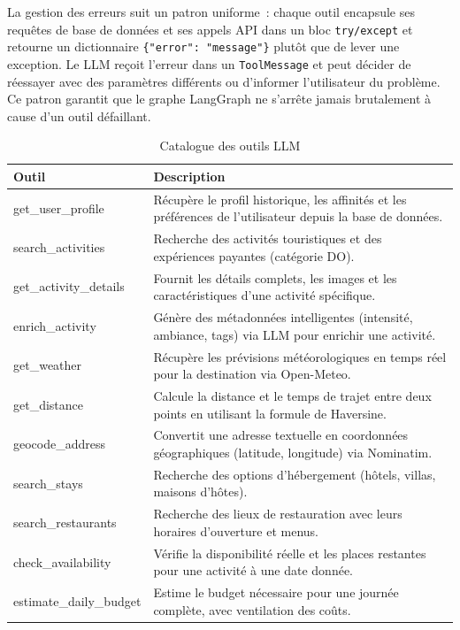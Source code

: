 La gestion des erreurs suit un patron uniforme~: chaque outil encapsule ses requêtes de base
de données et ses appels API dans un bloc \texttt{try/except} et retourne un dictionnaire
\texttt{\{"error": "message"\}} plutôt que de lever une exception. Le LLM reçoit l'erreur
dans un \texttt{ToolMessage} et peut décider de réessayer avec des paramètres différents ou
d'informer l'utilisateur du problème. Ce patron garantit que le graphe LangGraph ne s'arrête
jamais brutalement à cause d'un outil défaillant.

\begin{table}[H]
    \centering
    \caption{Catalogue des outils LLM}
    \label{tab:tools_catalog}
    \footnotesize
    \begin{tabular}{p{4.5cm} p{10.5cm}}
        \toprule
        \textbf{Outil} & \textbf{Description} \\
        \midrule
        get\_user\_profile & Récupère le profil historique, les affinités et les préférences de l'utilisateur depuis la base de données. \\[2pt]
        search\_activities & Recherche des activités touristiques et des expériences payantes (catégorie DO). \\[2pt]
        get\_activity\_details & Fournit les détails complets, les images et les caractéristiques d'une activité spécifique. \\[2pt]
        enrich\_activity & Génère des métadonnées intelligentes (intensité, ambiance, tags) via LLM pour enrichir une activité. \\[2pt]
        get\_weather & Récupère les prévisions météorologiques en temps réel pour la destination via Open-Meteo. \\[2pt]
        get\_distance & Calcule la distance et le temps de trajet entre deux points en utilisant la formule de Haversine. \\[2pt]
        geocode\_address & Convertit une adresse textuelle en coordonnées géographiques (latitude, longitude) via Nominatim. \\[2pt]
        search\_stays & Recherche des options d'hébergement (hôtels, villas, maisons d'hôtes). \\[2pt]
        search\_restaurants & Recherche des lieux de restauration avec leurs horaires d'ouverture et menus. \\[2pt]
        check\_availability & Vérifie la disponibilité réelle et les places restantes pour une activité à une date donnée. \\[2pt]
        estimate\_daily\_budget & Estime le budget nécessaire pour une journée complète, avec ventilation des coûts. \\[2pt]

\end{tabular}
\end{table}
